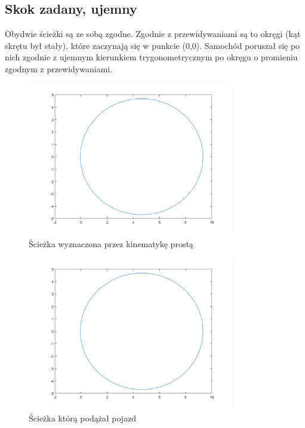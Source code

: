 \documentclass[a4paper, 12pt]{report}
\begin{document}
			\subsection{Skok zadany, ujemny}
				Obydwie ścieżki są ze sobą zgodne. Zgodnie z przewidywaniami są to okręgi (kąt skrętu był stały), które zaczynają się w punkcie (0,0). Samochód poruszał się po nich zgodnie z ujemnym kierunkiem trygonometrycznym po okręgu o promieniu zgodnym z przewidywaniami.
				\begin{figure}[H]
					\centering
					\includegraphics[width = 0.8\textwidth]{./AP/img/step_2_in_1.png}
					\caption{Ścieżka wyznaczona przez kinematykę prostą}
				\end{figure}
				\begin{figure}[H]
					\centering
					\includegraphics[width = 0.8\textwidth]{./AP/img/step_2_in_2.png}
					\caption{Ścieżka którą podążał pojazd}
				\end{figure}
\end{document}
